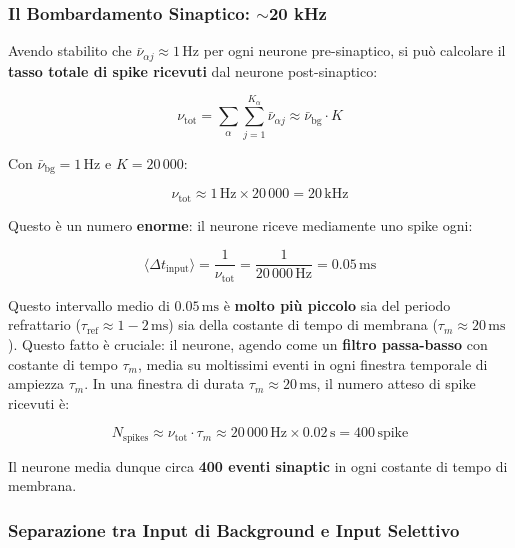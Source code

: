 \subsubsection{Il Bombardamento Sinaptico: $\sim$20 kHz}

Avendo stabilito che $\bar{\nu}_{\alpha j} \approx 1\,\text{Hz}$ per ogni neurone pre-sinaptico, si può calcolare il \textbf{tasso totale di spike ricevuti} dal neurone post-sinaptico:

\begin{equation}
\nu_{\text{tot}} = \sum_\alpha \sum_{j=1}^{K_\alpha} \bar{\nu}_{\alpha j} \approx \bar{\nu}_{\text{bg}} \cdot K
\end{equation}

Con $\bar{\nu}_{\text{bg}} = 1\,\text{Hz}$ e $K = 20\,000$:

\begin{equation}
\nu_{\text{tot}} \approx 1\,\text{Hz} \times 20\,000 = 20\,\text{kHz}
\end{equation}

Questo è un numero \textbf{enorme}: il neurone riceve mediamente uno spike ogni:

\begin{equation}
\langle \Delta t_{\text{input}} \rangle = \frac{1}{\nu_{\text{tot}}} = \frac{1}{20\,000\,\text{Hz}} = 0.05\,\text{ms}
\end{equation}

Questo intervallo medio di $0.05\,\text{ms}$ è \textbf{molto più piccolo} sia del periodo refrattario ($\tau_{\text{ref}} \approx 1-2\,\text{ms}$) sia della costante di tempo di membrana ($\tau_m \approx 20\,\text{ms}$). Questo fatto è cruciale: il neurone, agendo come un \textbf{filtro passa-basso} con costante di tempo $\tau_m$, media su moltissimi eventi in ogni finestra temporale di ampiezza $\tau_m$. In una finestra di durata $\tau_m \approx 20\,\text{ms}$, il numero atteso di spike ricevuti è:

\begin{equation}
N_{\text{spikes}} \approx \nu_{\text{tot}} \cdot \tau_m \approx 20\,000\,\text{Hz} \times 0.02\,\text{s} = 400\,\text{spike}
\end{equation}

Il neurone media dunque circa \textbf{400 eventi sinaptic} in ogni costante di tempo di membrana.


\subsubsection{Separazione tra Input di Background e Input Selettivo}


